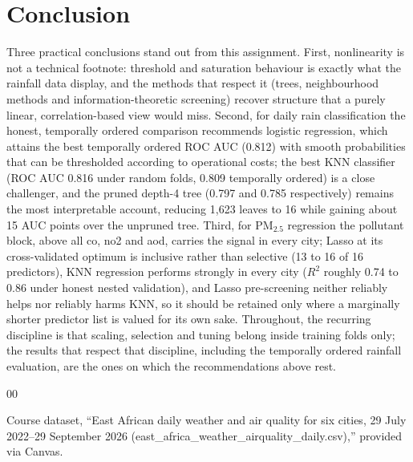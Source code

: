 \documentclass[conference]{IEEEtran}
\begin{document}
\section{Conclusion}
Three practical conclusions stand out from this assignment. First, nonlinearity is not a technical footnote: threshold and saturation behaviour is exactly what the rainfall data display, and the methods that respect it (trees, neighbourhood methods and information-theoretic screening) recover structure that a purely linear, correlation-based view would miss. Second, for daily rain classification the honest, temporally ordered comparison recommends logistic regression, which attains the best temporally ordered ROC AUC (0.812) with smooth probabilities that can be thresholded according to operational costs; the best KNN classifier (ROC AUC 0.816 under random folds, 0.809 temporally ordered) is a close challenger, and the pruned depth-4 tree (0.797 and 0.785 respectively) remains the most interpretable account, reducing 1{,}623 leaves to 16 while gaining about 15 AUC points over the unpruned tree. Third, for PM$_{2.5}$ regression the pollutant block, above all co, no2 and aod, carries the signal in every city; Lasso at its cross-validated optimum is inclusive rather than selective (13 to 16 of 16 predictors), KNN regression performs strongly in every city ($R^2$ roughly 0.74 to 0.86 under honest nested validation), and Lasso pre-screening neither reliably helps nor reliably harms KNN, so it should be retained only where a marginally shorter predictor list is valued for its own sake. Throughout, the recurring discipline is that scaling, selection and tuning belong inside training folds only; the results that respect that discipline, including the temporally ordered rainfall evaluation, are the ones on which the recommendations above rest.

\begin{thebibliography}{00}

Course dataset, ``East African daily weather and air quality for six cities, 29 July 2022--29 September 2026 (east\_africa\_weather\_airquality\_daily.csv),'' provided via Canvas.

\end{thebibliography}
\end{document}

